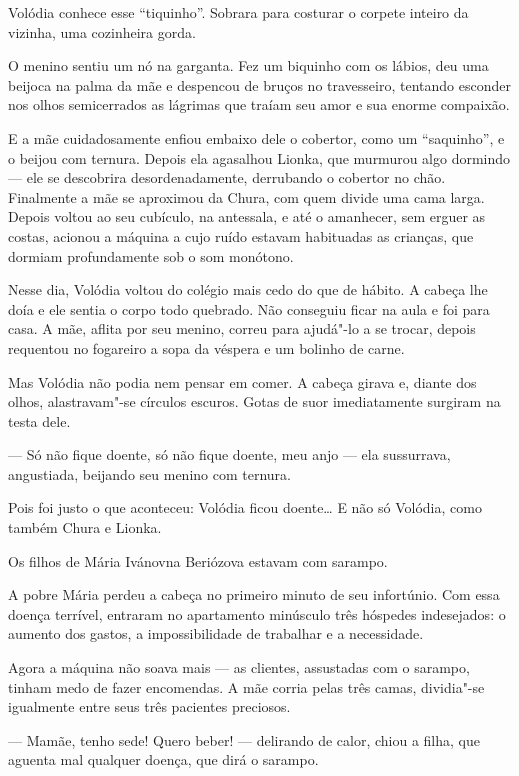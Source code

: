 Volódia conhece esse ``tiquinho''. Sobrara para costurar o corpete
inteiro da vizinha, uma cozinheira gorda.


O menino sentiu um nó na garganta. Fez um biquinho com os lábios, deu
uma beijoca na palma da mãe e despencou de bruços no travesseiro,
tentando esconder nos olhos semicerrados as lágrimas que traíam seu amor
e sua enorme compaixão.

E a mãe cuidadosamente enfiou embaixo dele o cobertor, como um
``saquinho'', e o beijou com ternura. Depois ela agasalhou Lionka, que
murmurou algo dormindo --- ele se descobrira desordenadamente, derrubando o cobertor no chão. Finalmente a mãe se aproximou da Chura,
com quem divide uma cama larga. Depois voltou ao seu cubículo, na
antessala, e até o amanhecer, sem erguer as costas, acionou a máquina a
cujo ruído estavam habituadas as crianças, que dormiam profundamente sob
o som monótono.

\asterisc

Nesse dia, Volódia voltou do colégio mais cedo do que de hábito. A cabeça
lhe doía e ele sentia o corpo todo quebrado. Não conseguiu ficar na
aula e foi para casa. A mãe, aflita por seu menino, correu para ajudá"-lo
a se trocar, depois requentou no fogareiro a sopa da véspera e um
bolinho de carne.

Mas Volódia não podia nem pensar em comer. A cabeça girava e, diante dos
olhos, alastravam"-se círculos escuros. Gotas de suor imediatamente
surgiram na testa dele.

--- Só não fique doente, só não fique doente, meu anjo --- ela
sussurrava, angustiada, beijando seu menino com ternura.

Pois foi justo o que aconteceu: Volódia ficou doente\ldots{} E não só
Volódia, como também Chura e Lionka.

Os filhos de Mária Ivánovna Beriózova estavam com sarampo.

A pobre Mária perdeu a cabeça no primeiro minuto de seu
infortúnio. Com essa doença terrível, entraram no apartamento minúsculo
três hóspedes indesejados: o aumento dos gastos, a impossibilidade de
trabalhar e a necessidade.

Agora a máquina não soava mais --- as clientes, assustadas com o
sarampo, tinham medo de fazer encomendas. A mãe corria pelas três camas,
dividia"-se igualmente entre seus três pacientes preciosos.

--- Mamãe, tenho sede! Quero beber! --- delirando de calor, chiou a filha,
que aguenta mal qualquer doença, que dirá o sarampo.

